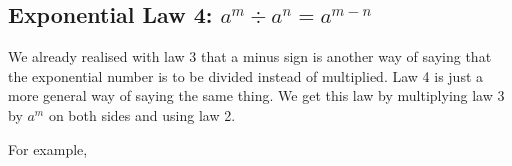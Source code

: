             \subsection{ Exponential Law 4: ${a}^{m}÷{a}^{n}={a}^{m-n}$}
            \nopagebreak
        \label{m38359*id65186}We already realised with law 3 that a minus sign is another way of saying that the exponential number is to be divided instead of multiplied. Law 4 is just a more general way of saying the same thing. We get this law by multiplying law 3 by ${a}^{m}$ on both sides and using law 2.\par 
        \label{m38359*uid24}\nopagebreak\noindent{}
        \label{m38359*id65293}For example,\par 
        \label{m38359*id65296}\nopagebreak\noindent{}
